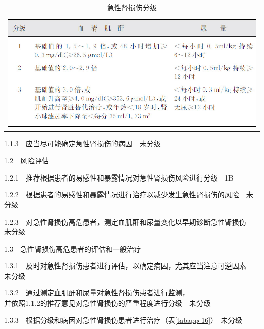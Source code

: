 \begin{longtable}{c}
  \caption{急性肾损伤分级}
  \label{tabapp-15}
  \endfirsthead
  \caption[]{急性肾损伤分级}
  \endhead
\includegraphics[width=\textwidth,height=\textheight,keepaspectratio]{./images/Image00319.jpg}
\end{longtable}

1.1.3　应当尽可能确定急性肾损伤的病因　未分级

1.2　风险评估

1.2.1　推荐根据患者的易感性和暴露情况对急性肾损伤风险进行分级　1B

1.2.2　根据患者的易感性和暴露情况进行治疗以减少发生急性肾损伤的风险　未分级

1.2.3　对急性肾损伤高危患者，测定血肌酐和尿量变化以早期诊断急性肾损伤　未分级

1.3　急性肾损伤高危患者的评估和一般治疗

1.3.1　及时对急性肾损伤患者进行评估，以确定病因，尤其应当注意可逆因素　未分级

1.3.2　通过测定血肌酐和尿量对急性肾损伤患者进行监测，\\
并依照1.1.2的推荐意见对急性肾损伤的严重程度进行分级　未分级

1.3.3　根据分级和病因对急性肾损伤患者进行治疗（表\ref{tabapp-16}）　未分级

